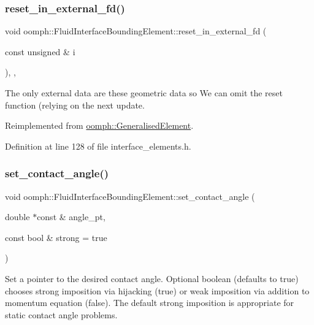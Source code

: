 \subsubsection{\texorpdfstring{reset\+\_\+in\+\_\+external\+\_\+fd()}{reset\_in\_external\_fd()}}
{\footnotesize\ttfamily void oomph\+::\+Fluid\+Interface\+Bounding\+Element\+::reset\+\_\+in\+\_\+external\+\_\+fd (\begin{DoxyParamCaption}\item[{const unsigned \&}]{i }\end{DoxyParamCaption})\hspace{0.3cm}{\ttfamily [inline]}, {\ttfamily [protected]}, {\ttfamily [virtual]}}



The only external data are these geometric data so We can omit the reset function (relying on the next update. 



Reimplemented from \hyperlink{classoomph_1_1GeneralisedElement_a027a9213e91b946346062adf96e26a85}{oomph\+::\+Generalised\+Element}.



Definition at line 128 of file interface\+\_\+elements.\+h.

\mbox{\label{classoomph_1_1FluidInterfaceBoundingElement_a8566c5bed5c87717fcb155d398ed8c8f}} 
\subsubsection{\texorpdfstring{set\+\_\+contact\+\_\+angle()}{set\_contact\_angle()}}
{\footnotesize\ttfamily void oomph\+::\+Fluid\+Interface\+Bounding\+Element\+::set\+\_\+contact\+\_\+angle (\begin{DoxyParamCaption}\item[{double $\ast$const \&}]{angle\+\_\+pt,  }\item[{const bool \&}]{strong = {\ttfamily true} }\end{DoxyParamCaption})}



Set a pointer to the desired contact angle. Optional boolean (defaults to true) chooses strong imposition via hijacking (true) or weak imposition via addition to momentum equation (false). The default strong imposition is appropriate for static contact angle problems. 

